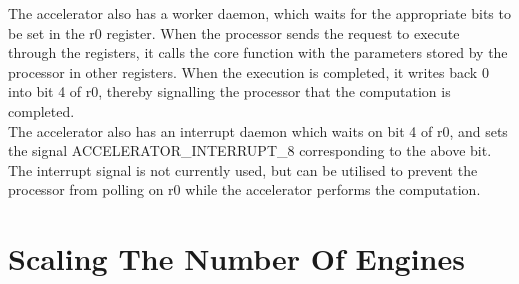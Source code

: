 \documentclass[a4paper,11pt, final]{report}
\begin{document}
The accelerator also has a worker daemon, which waits for the appropriate bits to be set in the r0 register. When the processor sends the request to execute through the registers, it calls the core function with the parameters stored by the processor in other registers. When the execution is completed, it writes back 0 into bit 4 of r0, thereby signalling the processor that the computation is completed.
\\

The accelerator also has an interrupt daemon which waits on bit 4 of r0, and sets the signal ACCELERATOR\_INTERRUPT\_8 corresponding to the above bit. The interrupt signal is not currently used, but can be utilised to prevent the processor from polling on r0 while the accelerator performs the computation.
\\


\section{Scaling The Number Of Engines}\label{sec:scale_eng}
\end{document}
